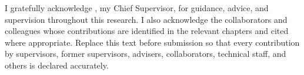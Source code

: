 
I gratefully acknowledge \chiefsupervisor, my Chief Supervisor, for guidance, advice, and supervision throughout this research. I also acknowledge the collaborators and colleagues whose contributions are identified in the relevant chapters and cited where appropriate. Replace this text before submission so that every contribution by supervisors, former supervisors, advisers, collaborators, technical staff, and others is declared accurately.
